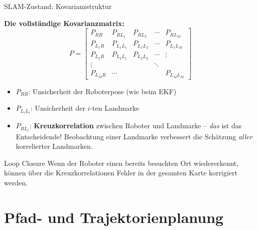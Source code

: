 \documentclass[%
  aspectratio=169,
  10pt
]{beamer}
\newcommand{\hl}[1]{{\color{fbblau}\textbf{#1}}}
\begin{document}
\begin{frame}{SLAM-Zustand: Kovarianzstruktur}

\textbf{Die vollständige Kovarianzmatrix:}
\[
  P =
  \begin{bmatrix}
    P_{RR} & P_{RL_1} & P_{RL_2} & \cdots & P_{RL_M} \\
    P_{L_1R} & P_{L_1L_1} & P_{L_1L_2} & \cdots & P_{L_1L_M} \\
    P_{L_2R} & P_{L_2L_1} & P_{L_2L_2} & \cdots & \vdots \\
    \vdots & & & \ddots & \\
    P_{L_MR} & \cdots & & & P_{L_ML_M}
  \end{bmatrix}
\]

\vspace{2mm}
\begin{itemize}
  \item $P_{RR}$: Unsicherheit der Roboterpose (wie beim EKF)
  \item $P_{L_iL_i}$: Unsicherheit der $i$-ten Landmarke
  \item $P_{RL_i}$: \hl{Kreuzkorrelation} zwischen Roboter und Landmarke --
        \emph{das} ist das Entscheidende! Beobachtung einer Landmarke
        verbessert die Schätzung \emph{aller} korrelierter Landmarken.
\end{itemize}

\vspace{2mm}
\begin{exampleblock}{Loop Closure}
  Wenn der Roboter einen bereits besuchten Ort wiedererkennt, können
  über die Kreuzkorrelationen Fehler in der gesamten Karte korrigiert werden.
\end{exampleblock}

\end{frame}


\section{Pfad- und Trajektorienplanung}
\end{document}
